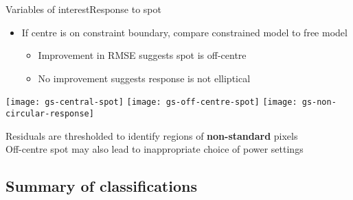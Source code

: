 \documentclass[8pt]{beamer}
\begin{document}
\begin{frame}{Variables of interest}{Response to spot}
	\begin{itemize}
		\item If centre is on constraint boundary, compare constrained model to free model
		\begin{itemize}
			\item Improvement in RMSE suggests spot is off-centre
			\item No improvement suggests response is not elliptical
		\end{itemize}
	\end{itemize}			%
	
	\begin{center}
		\texttt{[image: gs-central-spot]}
		\texttt{[image: gs-off-centre-spot]}			%
		\texttt{[image: gs-non-circular-response]}
	\end{center}
	Residuals are thresholded to identify regions of \textbf{non-standard} pixels\\
	Off-centre spot may also lead to inappropriate choice of power settings
\end{frame}
 


\subsection{Summary of classifications}
\end{document}
